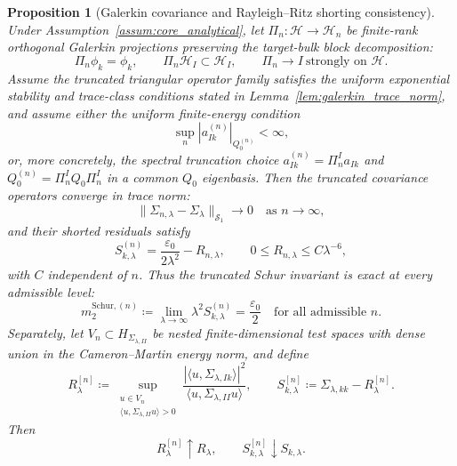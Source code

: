 \documentclass[preprint,12pt]{elsarticle}
\theoremstyle{plain}
\newtheorem{proposition}[theorem]{Proposition}
\theoremstyle{definition}
\theoremstyle{remark}
\begin{document}
    \begin{proposition}[Galerkin covariance and Rayleigh--Ritz shorting consistency]
        \label{prop:galerkin_consistency}
        Under Assumption~\ref{assum:core_analytical}, let $\Pi_n:\mathcal{H}\to\mathcal{H}_n$ be finite-rank orthogonal Galerkin projections preserving the target-bulk block decomposition:
        \begin{equation}
            \Pi_n\phi_k=\phi_k,\qquad \Pi_n\mathcal{H}_I\subset\mathcal{H}_I,\qquad \Pi_n\to I\ \text{strongly on }\mathcal{H}.
        \end{equation}
        Assume the truncated triangular operator family satisfies the uniform
        exponential stability and trace-class conditions stated in
        Lemma~\ref{lem:galerkin_trace_norm}, and assume either the uniform
        finite-energy condition
        \begin{equation}
            \sup_n |a_{Ik}^{(n)}|_{Q_0^{(n)}}<\infty,
        \end{equation}
        or, more concretely, the spectral truncation choice $a_{Ik}^{(n)}=\Pi_n^I a_{Ik}$ and $Q_0^{(n)}=\Pi_n^I Q_0\Pi_n^I$ in a common $Q_0$ eigenbasis.  Then the truncated covariance operators converge in trace norm:
        \begin{equation}
            \|\Sigma_{n,\lambda}-\Sigma_\lambda\|_{\mathcal{S}_1}\to0\quad\text{as }n\to\infty,
        \end{equation}
        and their shorted residuals satisfy
        \begin{equation}
            S_{k,\lambda}^{(n)}
            =
            \frac{\varepsilon_0}{2\lambda^2}-R_{n,\lambda},
            \qquad
            0\le R_{n,\lambda}\le C\lambda^{-6},
        \end{equation}
        with $C$ independent of $n$.  Thus the truncated Schur invariant is
        exact at every admissible level:
        \begin{equation}
            m_2^{\mathrm{Schur},(n)} \coloneqq \lim_{\lambda\to\infty} \lambda^2 S_{k,\lambda}^{(n)} = \frac{\varepsilon_0}{2} \quad \text{for all admissible } n.
        \end{equation}
        Separately, let $V_n\subset H_{\Sigma_{\lambda,II}}$ be nested
        finite-dimensional test spaces with dense union in the
        Cameron--Martin energy norm, and define
        \begin{equation}
            R_\lambda^{[n]}
            \coloneqq
            \sup_{\substack{u\in V_n\\ \langle u,\Sigma_{\lambda,II}u\rangle>0}}
            \frac{|\langle u,\Sigma_{\lambda,Ik}\rangle|^2}
                 {\langle u,\Sigma_{\lambda,II}u\rangle},
            \qquad
            S_{k,\lambda}^{[n]}
            \coloneqq
            \Sigma_{\lambda,kk}-R_\lambda^{[n]}.
        \end{equation}
        Then
        \begin{equation}
            R_\lambda^{[n]}\uparrow R_\lambda,
            \qquad
            S_{k,\lambda}^{[n]}\downarrow S_{k,\lambda}.
        \end{equation}
    \end{proposition}
\end{document}
